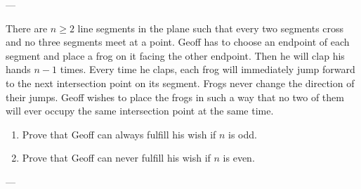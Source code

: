 
---

There are $n\ge2$ line segments in the plane such that every two segments cross and no three segments meet at a point. Geoff has to choose an endpoint of each segment and place a frog on it facing the other endpoint. Then he will clap his hands $n-1$ times. Every time he claps, each frog will immediately jump forward to the next intersection point on its segment. Frogs never change the direction of their jumps. Geoff wishes to place the frogs in such a way that no two of them will ever occupy the same intersection point at the same time.
\begin{enumerate}[label=(\alph*),itemsep=0em]
    \item Prove that Geoff can always fulfill his wish if $n$ is odd.
    \item Prove that Geoff can never fulfill his wish if $n$ is even.
\end{enumerate}

---

